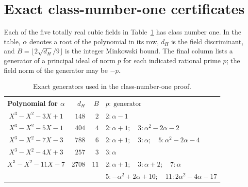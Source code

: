 \section{Exact class-number-one certificates}
\begin{proposition}
\label{cubic:corr:cubic-class-numbers}
Each of the five totally real cubic fields in
Table~\ref{cubic:corr:classnumber-table} has class number one.  In the table,
$\alpha$ denotes a root of the polynomial in its row, $d_H$ is the
field discriminant, and $B=\lfloor 2\sqrt{d_H}/9\rfloor$ is the
integer Minkowski bound.  The final column lists a generator of a
principal ideal of norm $p$ for each indicated rational prime $p$;
the field norm of the generator may be $-p$.
\end{proposition}

\begin{table}[htbp]
\centering
\small
\begin{tabular}{c|r|r|l}
 Polynomial for $\alpha$ & $d_H$ & $B$ & $p:\ \text{generator}$\\\hline
 $X^3-X^2-3X+1$ & $148$ & $2$ & $2:\alpha-1$\\
 $X^3-X^2-5X-1$ & $404$ & $4$ &
       $2:\alpha+1;\quad3:\alpha^2-2\alpha-2$\\
 $X^3-X^2-7X-3$ & $788$ & $6$ &
       $2:\alpha+1;\quad3:\alpha;\quad5:\alpha^2-2\alpha-4$\\
 $X^3-X^2-4X+3$ & $257$ & $3$ & $3:\alpha$\\
 $X^3-X^2-11X-7$ & $2708$ & $11$ &
       $2:\alpha+1;\quad3:\alpha+2;\quad7:\alpha$\\
 & & & $5:-\alpha^2+2\alpha+10;\quad11:2\alpha^2-4\alpha-17$
\end{tabular}
\caption{Exact generators used in the class-number-one proof.}
\label{cubic:corr:classnumber-table}
\end{table}


